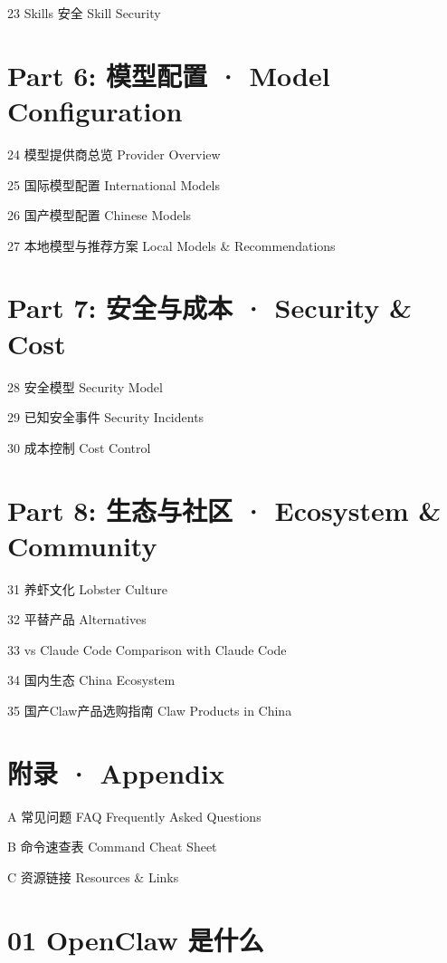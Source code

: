 \documentclass[
  10
]{article}
\begin{document}
23 Skills 安全 Skill Security

\section{Part 6: 模型配置 · Model
Configuration}\label{part-6-ux6a21ux578bux914dux7f6e-model-configuration}

24 模型提供商总览 Provider Overview

25 国际模型配置 International Models

26 国产模型配置 Chinese Models

27 本地模型与推荐方案 Local Models \& Recommendations

\section{Part 7: 安全与成本 · Security \&
Cost}\label{part-7-ux5b89ux5168ux4e0eux6210ux672c-security-cost}

28 安全模型 Security Model

29 已知安全事件 Security Incidents

30 成本控制 Cost Control

\section{Part 8: 生态与社区 · Ecosystem \&
Community}\label{part-8-ux751fux6001ux4e0eux793eux533a-ecosystem-community}

31 养虾文化 Lobster Culture

32 平替产品 Alternatives

33 vs Claude Code Comparison with Claude Code

34 国内生态 China Ecosystem

35 国产Claw产品选购指南 Claw Products in China

\section{附录 · Appendix}\label{ux9644ux5f55-appendix}

A 常见问题 FAQ Frequently Asked Questions

B 命令速查表 Command Cheat Sheet

C 资源链接 Resources \& Links

\section{01 OpenClaw 是什么}\label{openclaw-ux662fux4ec0ux4e48}
\end{document}
